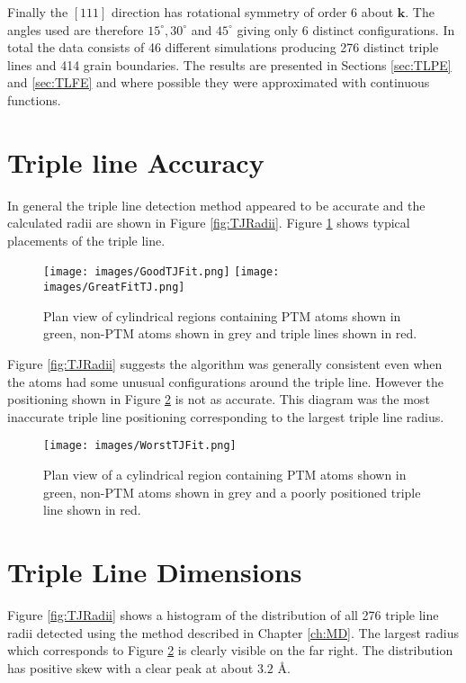 \documentclass[12pt,a4paper,openany]{report}
\begin{document}
Finally the $[1 1 1]$ direction has rotational symmetry of order 6 about $\mathbf{k}$. The angles used are therefore $15^{\circ},30^{\circ}$  and $45^{\circ}$ giving only 6 distinct configurations. In total the data consists of 46 different simulations producing 276 distinct triple lines and 414 grain boundaries. The results are presented in Sections \ref{sec:TLPE} and \ref{sec:TLFE} and where possible they were approximated with continuous functions.  

\section{Triple line Accuracy}

In general the triple line detection method appeared to be accurate and the calculated radii are shown in Figure \ref{fig:TJRadii}. Figure \ref{fig:GreatTJFit} shows typical placements of the triple line.

\begin{figure}[H]
	\centering
	\texttt{[image: images/GoodTJFit.png]} 
	\centering
	\texttt{[image: images/GreatFitTJ.png]} 
	\caption{Plan view of cylindrical regions containing PTM atoms shown in green, non-PTM atoms shown in grey and triple lines shown in red.} 
	\label{fig:GreatTJFit}
\end{figure}

Figure \ref{fig:TJRadii} suggests the algorithm was generally consistent even when the atoms had some unusual configurations around the triple line. However the positioning shown in Figure \ref{fig:WorstTJFit} is not as accurate. This diagram was the most inaccurate triple line positioning corresponding to the largest triple line radius.  

\begin{figure}[H]
	\centering
	\texttt{[image: images/WorstTJFit.png]} 
	\caption{Plan view of a cylindrical region containing PTM atoms shown in green, non-PTM atoms shown in grey and a poorly positioned triple line shown in red.}
	\label{fig:WorstTJFit}
\end{figure}

\newpage
\section{Triple Line Dimensions}

Figure \ref{fig:TJRadii} shows a histogram of the distribution of all 276 triple line radii detected using the method described in Chapter \ref{ch:MD}. The largest radius which corresponds to Figure \ref{fig:WorstTJFit} is clearly visible on the far right. The distribution has positive skew with a clear peak at about $3.2 \textrm{ \AA}$. 
\end{document}
